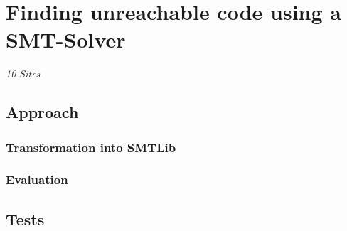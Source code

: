 \chapter{Finding unreachable code using a SMT-Solver}
\label{cha:finding unreachable code using a smt-solver}
\emph{10 Sites}

\section{Approach}
\subsection{Transformation into SMTLib}
\subsection{Evaluation}
\section{Tests}

